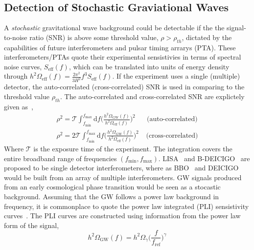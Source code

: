\documentclass[nofootinbib,twocolumn,preprintnumbers]{revtex4-1}
\begin{document}
\subsection{Detection of Stochastic Graviational Waves}
\label{sec:detection}
A \textit{stochastic} gravitational wave background could be detectable if the the signal-to-noise ratio (SNR) is above some threshold value, $\rho > \rho_{th}$, dictated by the capabilities of future interferometers and pulsar timing arrarys (PTA). These interferometers/PTAs quote their experimental sensistivies in terms of spectral noise curves, $S_{\textrm{eff}}(f)$, which can be translated into units of energy density through $h^2 \Omega_{\textrm{eff}}(f) = \frac{2\pi^2}{3H^2}f^3 S_{\textrm{eff}}(f)$. If the experiment uses a single (multiple) detector, the auto-correlated (cross-correlated) SNR is used in comparing to the threshold value $\rho_{th}$. The auto-correlated and cross-correlated SNR are explictely given as~\cite{PhysRevD.59.102001},
\begin{equation}\label{eqn::SNR}
\begin{split}
\rho^2 =  \mathcal{T} \int_{f_{\textrm{min}}}^{f_{\textrm{max}}}\textrm{d}f \bigg( \frac{h^2 \Omega_{\textrm{GW}}(f)}{h^2 \Omega_{\textrm{eff}}(f)} \bigg)^2 \;\;\;\;\;\; \textrm{(auto-correlated)}
\\
\rho^2 = 2 \mathcal{T} \int_{f_{\textrm{min}}}^{f_{\textrm{max}}}\textrm{d}f \bigg( \frac{h^2 \Omega_{\textrm{GW}}(f)}{h^2 \Omega_{\textrm{eff}}(f)} \bigg)^2 \;\;\;\: \textrm{(cross-correlated)}
\end{split}
\end{equation}
Where $\mathcal{T}$ is the exposure time of the experiment. The integration covers the entire broadband range of frequencies $(f_{\textrm{min}}, f_{\textrm{max}})$. LISA~\citep{Audley:2017drz} and B-DEICIGO~\citep{10.1093/ptep/pty078} are proposed to be single detector interferometers, where as BBO~\citep{PhysRevD.72.083005} and DEICIGO~\citep{Sato_2017} would be built from an array of multiple interferometers.
GW signals produced from an early cosmological phase transition would be seen as a stocastic background. Assuming that the GW follows a power law background in frequency, it is commonplace to quote the power law integrated (PLI) sensistivity curves~\cite{PhysRevD.88.124032}. The PLI curves are constructed using information from the power law form of the signal,
\begin{equation}\label{eqn::PowerLaw}
h^2 \Omega_{\textrm{GW}}(f) = h^2 \Omega_{\gamma}  \bigg(\frac{f}{f_{\textrm{ref}}}\bigg)^{\gamma}
\end{equation}
\end{document}
